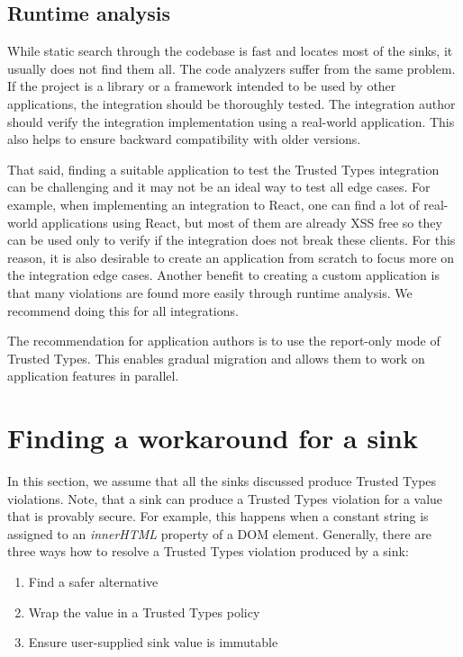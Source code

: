 \subsection{Runtime analysis}

While static search through the codebase is fast and locates most of the sinks, it usually does not
find them all. The code analyzers suffer from the same problem. If the project is a library or a
framework intended to be used by other applications, the integration should be thoroughly tested.
The integration author should verify the integration implementation using a real-world application.
This also helps to ensure backward compatibility with older versions.

That said, finding a suitable application to test the Trusted Types integration can be challenging
and it may not be an ideal way to test all edge cases. For example, when implementing an integration
to React, one can find a lot of real-world applications using React, but most of them are already XSS
free so they can be used only to verify if the integration does not break these clients. For this
reason, it is also desirable to create an application from scratch to focus more on the integration
edge cases. Another benefit to creating a custom application is that many violations are found more
easily through runtime analysis. We recommend doing this for all integrations.

The recommendation for application authors is to use the report-only mode of Trusted Types. This
enables gradual migration and allows them to work on application features in parallel.

\section{Finding a workaround for a sink}

In this section, we assume that all the sinks discussed produce Trusted Types violations. Note, that
a sink can produce a Trusted Types violation for a value that is provably secure. For example, this
happens when a constant string is assigned to an \emph{innerHTML} property of a DOM element.
Generally, there are three ways how to resolve a Trusted Types violation produced by a sink:

\begin{enumerate}
  \item Find a safer alternative
  \item Wrap the value in a Trusted Types policy
  \item Ensure user-supplied sink value is immutable
\end{enumerate}

